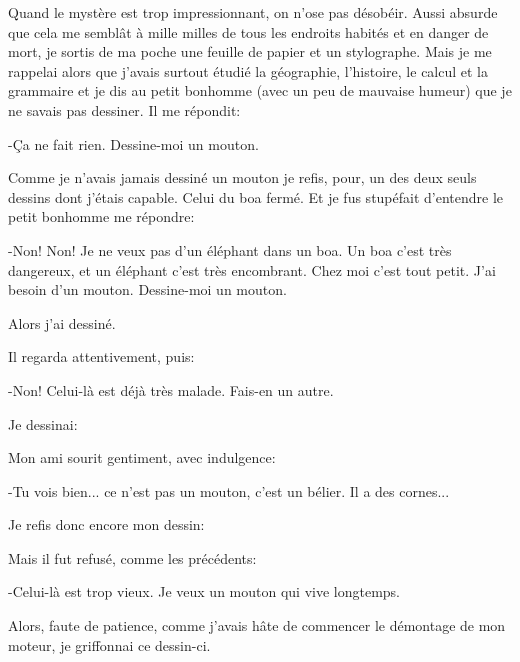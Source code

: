 \documentclass{report}
\begin{document}
Quand le mystère est trop impressionnant, on n'ose pas désobéir. Aussi absurde que cela me semblât à mille milles de tous les endroits habités et en danger de mort, je sortis de ma poche une feuille de papier et un stylographe. Mais je me rappelai alors que j'avais surtout étudié la géographie, l'histoire, le calcul et la grammaire et je dis au petit bonhomme (avec un peu de mauvaise humeur) que je ne savais pas dessiner. Il me répondit:

-Ça ne fait rien. Dessine-moi un mouton.

Comme je n'avais jamais dessiné un mouton je refis, pour, un des deux seuls dessins dont j'étais capable. Celui du boa fermé. Et je fus stupéfait d'entendre le petit bonhomme me répondre:

-Non! Non! Je ne veux pas d'un éléphant dans un boa. Un boa c'est très dangereux, et un éléphant c'est très encombrant. Chez moi c'est tout petit. J'ai besoin d'un mouton. Dessine-moi un mouton.

Alors j'ai dessiné.


Il regarda attentivement, puis:

-Non! Celui-là est déjà très malade. Fais-en un autre.

Je dessinai:


Mon ami sourit gentiment, avec indulgence:

-Tu vois bien... ce n'est pas un mouton, c'est un bélier. Il a des cornes...

Je refis donc encore mon dessin: 


Mais il fut refusé, comme les précédents:

-Celui-là est trop vieux. Je veux un mouton qui vive longtemps.

Alors, faute de patience, comme j'avais hâte de commencer le démontage de mon moteur, je griffonnai ce dessin-ci.
\end{document}

